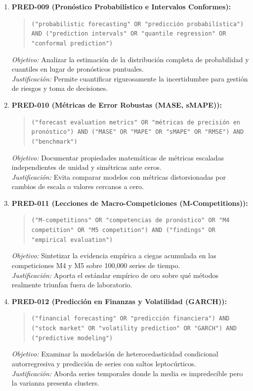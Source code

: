 \begin{enumerate}
  \item \textbf{PRED-009 (Pronóstico Probabilístico e Intervalos Conformes):}
  \begin{quote}
  \texttt{("probabilistic forecasting" OR "predicción probabilística") AND ("prediction intervals" OR "quantile regression" OR "conformal prediction")}
  \end{quote}
  \textit{Objetivo:} Analizar la estimación de la distribución completa de probabilidad y cuantiles en lugar de pronósticos puntuales.\\
  \textit{Justificación:} Permite cuantificar rigurosamente la incertidumbre para gestión de riesgos y toma de decisiones.
  \item \textbf{PRED-010 (Métricas de Error Robustas (MASE, sMAPE)):}
  \begin{quote}
  \texttt{("forecast evaluation metrics" OR "métricas de precisión en pronóstico") AND ("MASE" OR "MAPE" OR "sMAPE" OR "RMSE") AND ("benchmark")}
  \end{quote}
  \textit{Objetivo:} Documentar propiedades matemáticas de métricas escaladas independientes de unidad y simétricas ante ceros.\\
  \textit{Justificación:} Evita comparar modelos con métricas distorsionadas por cambios de escala o valores cercanos a cero.
  \item \textbf{PRED-011 (Lecciones de Macro-Competiciones (M-Competitions)):}
  \begin{quote}
  \texttt{("M-competitions" OR "competencias de pronóstico" OR "M4 competition" OR "M5 competition") AND ("findings" OR "empirical evaluation")}
  \end{quote}
  \textit{Objetivo:} Sintetizar la evidencia empírica a ciegas acumulada en las competiciones M4 y M5 sobre 100,000 series de tiempo.\\
  \textit{Justificación:} Aporta el estándar empírico de oro sobre qué métodos realmente triunfan fuera de laboratorio.
  \item \textbf{PRED-012 (Predicción en Finanzas y Volatilidad (GARCH)):}
  \begin{quote}
  \texttt{("financial forecasting" OR "predicción financiera") AND ("stock market" OR "volatility prediction" OR "GARCH") AND ("predictive modeling")}
  \end{quote}
  \textit{Objetivo:} Examinar la modelación de heterocedasticidad condicional autorregresiva y predicción de series con saltos leptocúrticos.\\
  \textit{Justificación:} Aborda series temporales donde la media es impredecible pero la varianza presenta clusters.

\end{enumerate}
